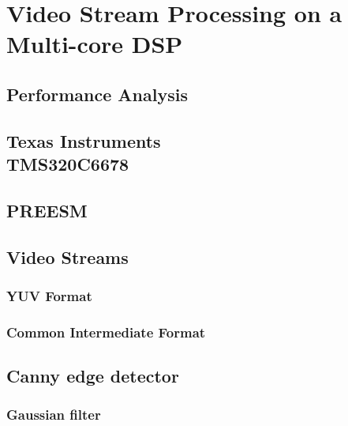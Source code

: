 \chapter{Video Stream Processing on a Multi-core DSP}
\label{chapter:experiments}


\section{Performance Analysis}
\label{sec:performance-analysis}


\section[Texas Instruments TMS320C6678]{Texas Instruments\\TMS320C6678}
\label{sec:c6678}


\section{PREESM}
\label{sec:preesm}


\section{Video Streams}
\label{sec:video-streams}

\subsection{YUV Format}
\label{subsec:yuv}

\subsection{Common Intermediate Format}
\label{subsec:cif}

\section{Canny edge detector}
\label{sec:canny}


\subsection{Gaussian filter}
\label{subsec:gauss}


